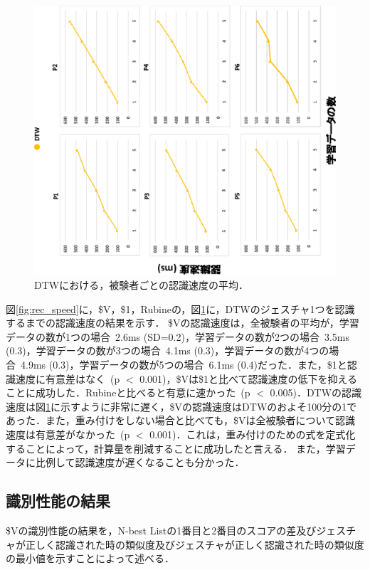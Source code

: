 \begin{figure}[!h]
\centering
\includegraphics[width=1.0\columnwidth,angle=-90]{img/rec_speed_dtw.eps}
\caption{DTWにおける，被験者ごとの認識速度の平均．}
\label{fig:rec_speed_dtw}
\end{figure}

図\ref{fig:rec_speed}に，\$V，\$1，Rubineの，図\ref{fig:rec_speed_dtw}に，DTWのジェスチャ1つを認識するまでの認識速度の結果を示す．
\$Vの認識速度は，全被験者の平均が，学習データの数が1つの場合~2.6ms (SD=0.2)，学習データの数が2つの場合~3.5ms (0.3)，学習データの数が3つの場合~4.1ms (0.3)，学習データの数が4つの場合~4.9ms (0.3)，学習データの数が5つの場合~6.1ms (0.4)だった．また，\$1と認識速度に有意差はなく~(p $<$ 0.001)，\$Vは\$1と比べて認識速度の低下を抑えることに成功した．Rubineと比べると有意に速かった~(p $<$ 0.005)．DTWの認識速度は図\ref{fig:rec_speed_dtw}に示すように非常に遅く，\$Vの認識速度はDTWのおよそ100分の1であった．また，重み付けをしない場合と比べても，\$Vは全被験者について認識速度は有意差がなかった~(p $<$ 0.001)．これは，重み付けのための式を定式化することによって，計算量を削減することに成功したと言える．
また，学習データに比例して認識速度が遅くなることも分かった．

\clearpage
\subsection{識別性能の結果}
\$Vの識別性能の結果を，N-best Listの1番目と2番目のスコアの差及びジェスチャが正しく認識された時の類似度及びジェスチャが正しく認識された時の類似度の最小値を示すことによって述べる．

